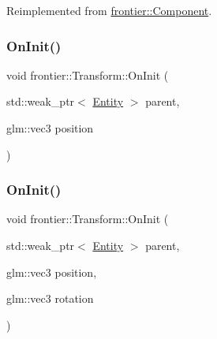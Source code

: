 Reimplemented from \hyperlink{classfrontier_1_1_component_af3da02905c4d79219d9b12f260a35ad1}{frontier\+::\+Component}.

\mbox{\label{classfrontier_1_1_transform_a16be3bd6b4a08d457251aea5d65e618f}} 
\subsubsection{\texorpdfstring{On\+Init()}{OnInit()}\hspace{0.1cm}{\footnotesize\ttfamily [2/4]}}
{\footnotesize\ttfamily void frontier\+::\+Transform\+::\+On\+Init (\begin{DoxyParamCaption}\item[{std\+::weak\+\_\+ptr$<$ \hyperlink{classfrontier_1_1_entity}{Entity} $>$}]{parent,  }\item[{glm\+::vec3}]{position }\end{DoxyParamCaption})}

\mbox{\label{classfrontier_1_1_transform_a084ca60da3da27b89acd8dd4c88e808c}} 
\subsubsection{\texorpdfstring{On\+Init()}{OnInit()}\hspace{0.1cm}{\footnotesize\ttfamily [3/4]}}
{\footnotesize\ttfamily void frontier\+::\+Transform\+::\+On\+Init (\begin{DoxyParamCaption}\item[{std\+::weak\+\_\+ptr$<$ \hyperlink{classfrontier_1_1_entity}{Entity} $>$}]{parent,  }\item[{glm\+::vec3}]{position,  }\item[{glm\+::vec3}]{rotation }\end{DoxyParamCaption})}

\mbox{\label{classfrontier_1_1_transform_a19b8764fddefc031742d317811b261a0}} 
